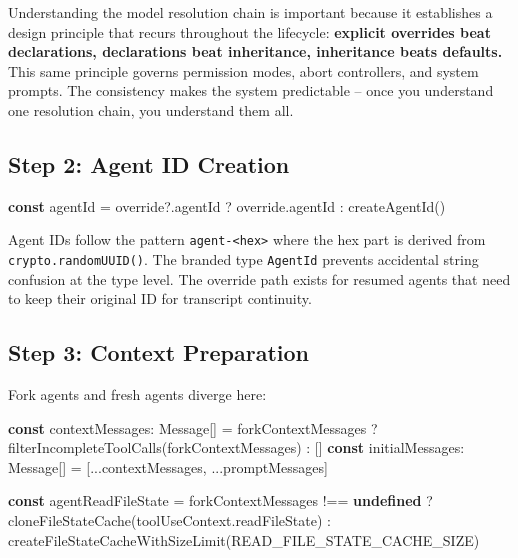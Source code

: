 \documentclass[
  english,
  11pt,
  letterpaper,
]{book}
\newenvironment{Shaded}{\begin{snugshade}}{\end{snugshade}}
\newcommand{\AttributeTok}[1]{\textcolor[rgb]{0.40,0.45,0.13}{#1}}
\newcommand{\FunctionTok}[1]{\textcolor[rgb]{0.28,0.35,0.67}{#1}}
\newcommand{\KeywordTok}[1]{\textcolor[rgb]{0.00,0.23,0.31}{\textbf{#1}}}
\newcommand{\NormalTok}[1]{\textcolor[rgb]{0.00,0.23,0.31}{#1}}
\newcommand{\OperatorTok}[1]{\textcolor[rgb]{0.37,0.37,0.37}{#1}}
\begin{document}
Understanding the model resolution chain is important because it
establishes a design principle that recurs throughout the lifecycle:
\textbf{explicit overrides beat declarations, declarations beat
inheritance, inheritance beats defaults.} This same principle governs
permission modes, abort controllers, and system prompts. The consistency
makes the system predictable -- once you understand one resolution
chain, you understand them all.

\subsection{Step 2: Agent ID Creation}\label{step-2-agent-id-creation}

\begin{Shaded}
\begin{Highlighting}[]
\KeywordTok{const}\NormalTok{ agentId }\OperatorTok{=}\NormalTok{ override}\OperatorTok{?.}\AttributeTok{agentId} \OperatorTok{?}\NormalTok{ override}\OperatorTok{.}\AttributeTok{agentId} \OperatorTok{:} \FunctionTok{createAgentId}\NormalTok{()}
\end{Highlighting}
\end{Shaded}

Agent IDs follow the pattern \texttt{agent-\textless{}hex\textgreater{}}
where the hex part is derived from \texttt{crypto.randomUUID()}. The
branded type \texttt{AgentId} prevents accidental string confusion at
the type level. The override path exists for resumed agents that need to
keep their original ID for transcript continuity.

\subsection{Step 3: Context
Preparation}\label{step-3-context-preparation}

Fork agents and fresh agents diverge here:

\begin{Shaded}
\begin{Highlighting}[]
\KeywordTok{const}\NormalTok{ contextMessages}\OperatorTok{:}\NormalTok{ Message[] }\OperatorTok{=}\NormalTok{ forkContextMessages}
  \OperatorTok{?} \FunctionTok{filterIncompleteToolCalls}\NormalTok{(forkContextMessages)}
  \OperatorTok{:}\NormalTok{ []}
\KeywordTok{const}\NormalTok{ initialMessages}\OperatorTok{:}\NormalTok{ Message[] }\OperatorTok{=}\NormalTok{ [}\OperatorTok{...}\NormalTok{contextMessages}\OperatorTok{,} \OperatorTok{...}\NormalTok{promptMessages]}

\KeywordTok{const}\NormalTok{ agentReadFileState }\OperatorTok{=}\NormalTok{ forkContextMessages }\OperatorTok{!==} \KeywordTok{undefined}
  \OperatorTok{?} \FunctionTok{cloneFileStateCache}\NormalTok{(toolUseContext}\OperatorTok{.}\AttributeTok{readFileState}\NormalTok{)}
  \OperatorTok{:} \FunctionTok{createFileStateCacheWithSizeLimit}\NormalTok{(READ\_FILE\_STATE\_CACHE\_SIZE)}
\end{Highlighting}
\end{Shaded}
\end{document}
